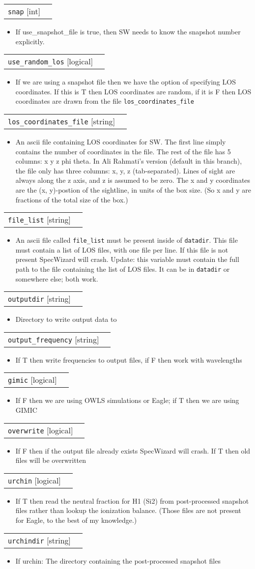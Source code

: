 \documentclass{report}
\makeatletter
\newcommand{\paramdefinition}[3]{
\begin{tabular*}{\textwidth}{l@{\extracolsep{\fill}}r}
		{\tt #1} [{\sc #2}]& #3 \\
\end{tabular*}}
\newcommand{\paramdescription}[1]{
\begin{itemize}
\item #1
\end{itemize}\vspace{0.2cm}}
\newcommand{\param}[1]{{\tt #1}}
\makeatother
\begin{document}
\paramdefinition{snap}{int}{}
\paramdescription{If use\_snapshot\_file is true, then SW needs to know the snapshot number explicitly.}

\paramdefinition{use\_random\_los}{logical}{}
\paramdescription{If we are using a snapshot file then we have the option of specifying LOS coordinates.  If this is T then LOS coordinates are random, if it is F then LOS coordinates are drawn from the file {\tt los\_coordinates\_file}}

\paramdefinition{los\_coordinates\_file}{string}{}
\paramdescription{An ascii file containing LOS coordinates for SW. The first line simply contains the number of coordinates in the file. The rest of the file has 5 columns: x y z phi theta. In Ali Rahmati's version (default in this branch), the file only has three columns: x, y, z (tab-separated). Lines of sight are always along the z axis, and z is assumed to be zero. The x and y coordinates are the (x, y)-postion of the sightline, in units of the box size. (So x and y are fractions of the total size of the box.)}

\paramdefinition{file\_list}{string}{}
\paramdescription{An ascii file called {\tt file\_list} must be present inside of {\tt datadir}.  This file must contain a list of LOS files, with one file per line.  If this file is not present SpecWizard will crash. Update: this variable must contain the full path to the file containing the list of LOS files. It can be in \param{datadir} or somewhere else; both work.}

\paramdefinition{outputdir}{string}{}
\paramdescription{Directory to write output data to}

\paramdefinition{output\_frequency}{string}{}
\paramdescription{If T then write frequencies to output files, if F then work with wavelengths}

\paramdefinition{gimic}{logical}{}
\paramdescription{If F then we are using OWLS simulations or Eagle; if T then we are using GIMIC}

\paramdefinition{overwrite}{logical}{}
\paramdescription{If F then if the output file already exists SpecWizard will crash.  If T then old files will be overwritten}

\paramdefinition{urchin}{logical}{}
\paramdescription{If T then read the neutral fraction for H1 (Si2) from post-processed snapshot files rather than lookup the ionization balance. (Those files are not present for Eagle, to the best of my knowledge.)}

\paramdefinition{urchindir}{string}{}
\paramdescription{If urchin: The directory containing the post-processed snapshot files}
\end{document}
